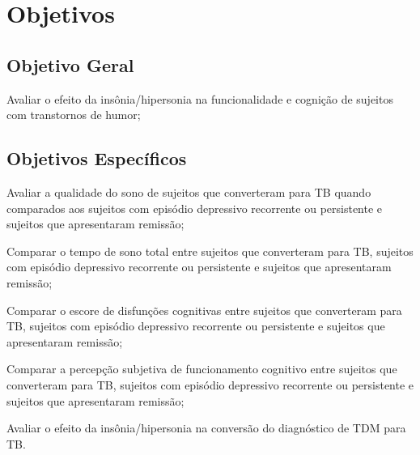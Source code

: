 \documentclass[chapter=TITLE,oneside,12pt,a4paper,english,brazil]{abntex2} %
\begin{document}
\vspace{\onelineskip}
\chapter{Objetivos}\label{sec:objetivos}

\section{Objetivo Geral}\label{sec:geral}

    \begin{alineas}

        \item Avaliar o efeito da insônia/hipersonia na funcionalidade e
        cognição de sujeitos com transtornos de humor;
    \end{alineas}

\section{Objetivos Específicos}\label{sec:especifico}

    \begin{alineas}[resume]

        \item Avaliar a qualidade do sono de sujeitos que converteram para TB
        quando comparados aos sujeitos com episódio depressivo recorrente ou
        persistente e sujeitos que apresentaram remissão;
        \item Comparar o tempo de sono total entre sujeitos que converteram para
        TB, sujeitos com episódio depressivo recorrente ou persistente e sujeitos
        que apresentaram remissão;
        \item Comparar o escore de disfunções cognitivas entre sujeitos que
        converteram para TB, sujeitos com episódio depressivo recorrente ou
        persistente e sujeitos que apresentaram remissão;
        \item Comparar a percepção subjetiva de funcionamento cognitivo entre
        sujeitos que converteram para TB, sujeitos com episódio depressivo
        recorrente ou persistente e sujeitos que apresentaram remissão;
        \item Avaliar o efeito da insônia/hipersonia na conversão do
        diagnóstico de TDM para TB.

    \end{alineas}

\vspace{\onelineskip}
\end{document}
